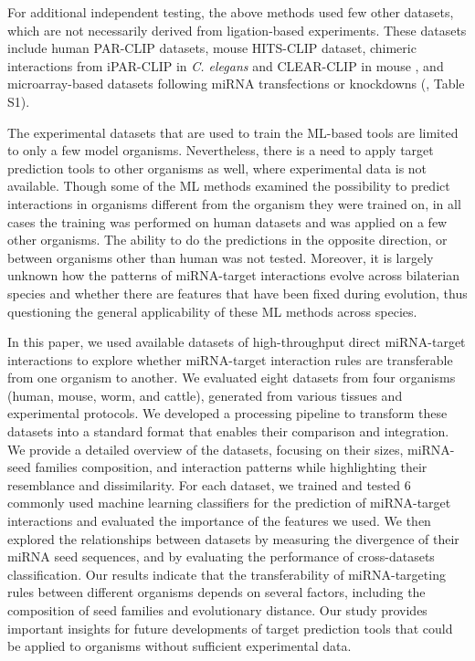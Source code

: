 \documentclass{bmcart}
\begin{document}
For additional independent testing, the above methods used few other datasets, which are not necessarily derived from ligation-based experiments. These datasets include human PAR-CLIP datasets, mouse HITS-CLIP dataset, chimeric interactions from iPAR-CLIP in \textit{C. elegans} and CLEAR-CLIP in mouse \cite{darnell_moore2015mirna}, and microarray-based datasets following miRNA transfections or knockdowns (, Table S1). 

The experimental datasets that are used to train the ML-based tools are limited to only a few model organisms. Nevertheless, there is a need to apply target prediction tools to other organisms as well, where experimental data is not available. Though some of the ML methods examined the possibility to predict interactions in organisms different from the organism they were trained on, in all cases the training was performed on human datasets and was applied on a few other organisms. The ability to do the predictions in the opposite direction, or between organisms other than human was not tested. Moreover, it is largely unknown how the patterns of miRNA-target interactions evolve across bilaterian species and whether there are features that have been fixed during evolution, thus questioning the general applicability of these ML methods across species.  

In this paper, we used available datasets of high-throughput direct miRNA-target interactions to explore whether miRNA-target interaction rules are transferable from one organism to another. We evaluated eight datasets from four organisms (human, mouse, worm, and cattle), generated from various tissues and experimental protocols. We developed a processing pipeline to transform these datasets into a standard format that enables their comparison and integration. We provide a detailed overview of the datasets, focusing on their sizes, miRNA-seed families composition, and interaction patterns while highlighting their resemblance and dissimilarity. For each dataset, we trained and tested 6 commonly used machine learning classifiers for the prediction of miRNA-target interactions and evaluated the importance of the features we used.
We then explored the relationships between datasets by measuring the divergence of their miRNA seed sequences, and by evaluating the performance of cross-datasets classification. Our results indicate that the transferability of miRNA-targeting rules between different organisms depends on several factors, including the composition of seed families and evolutionary distance. Our study provides important insights for future developments of target prediction tools that could be applied to organisms without sufficient experimental data.
\end{document}
